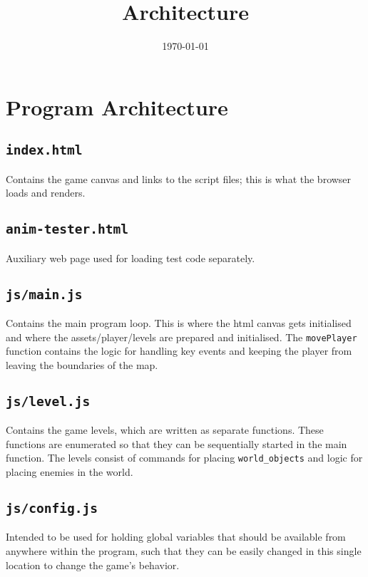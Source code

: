 \documentclass[11pt]{article}
\date{\today}
\title{Architecture}
\begin{document}
\maketitle


\section{Program Architecture}
\label{sec:org5c30941}
\subsection{\texttt{index.html}}
\label{sec:org05d4b2e}
Contains the game canvas and links to the script files; this is what the browser loads and renders.\\
\subsection{\texttt{anim-tester.html}}
\label{sec:org50b6e52}
Auxiliary web page used for loading test code separately.\\
\subsection{\texttt{js/main.js}}
\label{sec:orgaf183d3}
Contains the main program loop. This is where the html canvas gets initialised and where the assets/player/levels are prepared and initialised. The \texttt{movePlayer} function contains the logic for handling key events and keeping the player from leaving the boundaries of the map.\\
\subsection{\texttt{js/level.js}}
\label{sec:orge92b4f0}
Contains the game levels, which are written as separate functions. These functions are enumerated so that they can be sequentially started in the main function. The levels consist of commands for placing \texttt{world\_objects} and logic for placing enemies in the world.\\
\subsection{\texttt{js/config.js}}
\label{sec:org131b421}
Intended to be used for holding global variables that should be available from anywhere within the program, such that they can be easily changed in this single location to change the game's behavior.\\
\end{document}
